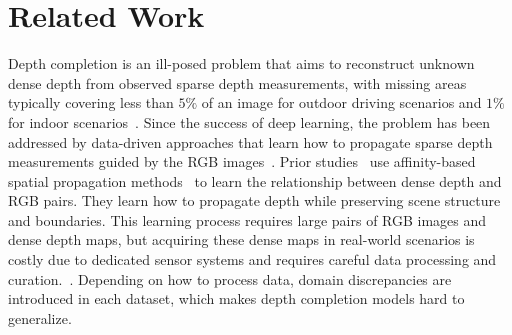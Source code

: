 \section{Related Work}
Depth completion is an ill-posed problem that aims to reconstruct unknown dense depth from observed
sparse depth measurements, with missing areas typically covering less than $5\%$ of an image for outdoor driving scenarios and $1\%$ for indoor scenarios~\cite{wong2020void}.
Since the success of deep learning, 
the problem 
has been addressed
by data-driven approaches that learn how to propagate sparse depth measurements
guided by the RGB images~\cite{wong2021unsupervised, park2020nonlocal}.
Prior studies~\cite{park2020nonlocal, lin2022dynamic, zhang2023completionformer} use affinity-based spatial propagation methods~\cite{liu2017learning, cheng2019learning}
to learn the relationship between dense depth and RGB pairs.
They learn how to propagate depth while preserving scene structure and boundaries.
This learning process requires large pairs of RGB images and dense depth maps, but acquiring these dense maps in real-world scenarios is costly due to dedicated sensor systems and requires careful data processing and curation.~\cite{uhrig2017sparsity, wong2020void}.
Depending on how to process data, domain discrepancies are introduced in each dataset, which makes depth completion models hard to generalize.%

